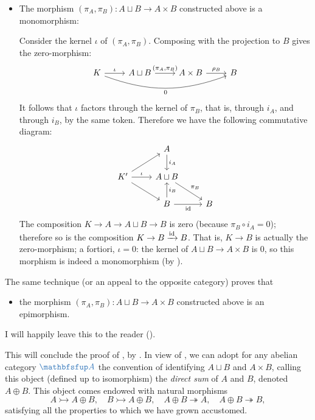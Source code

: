 \begin{itemize}
  By the same token, $\pi_A : A \sqcup B \to A$ is the cokernel of
  $i_B : B \to A \sqcup B$ and $i_B : B \to A \sqcup B$ is the kernel
  of $\pi_A : A \sqcup B \to A$.
\item The morphism $(\pi_A, \pi_B) : A \sqcup B \to A \times B$
  constructed above is a monomorphism:

  Consider the kernel $\iota$ of $(\pi_A, \pi_B)$. Composing with the
  projection to $B$ gives the zero-morphism:
  \[\begin{tikzcd}
      K \arrow[r, "\iota"] \arrow[rrr, "0"', bend right=20] & A \sqcup
      B \arrow[r, "{(\pi_A, \pi_B)}"] & A \times B \arrow[r, "\rho_B"]
      & B
    \end{tikzcd}\] It follows that $\iota$ factors through the kernel
  of $\pi_B$, that is, through $i_A$, and through $i_B$, by the same
  token.  Therefore we have the following commutative diagram:
  \[\begin{tikzcd}
      & A \arrow[d, "i_A"] & \\
      K \arrow[ur] \arrow[dr]' \arrow[r, "\iota"] &
      A \sqcup B \arrow[dr, "\pi_B"] & \\
      & B \arrow[u, "i_B"'] \arrow[r, "\id"'] & B
    \end{tikzcd}\] The composition $K \to A \to A \sqcup B \to B$ is
  zero (because $\pi_B \circ i_A = 0$); therefore so is the
  composition $K \to B \xrightarrow{\operatorname{id}} B$. That is, $K \to B$ is
  actually the zero-morphism; a fortiori, $\iota = 0$: the kernel of
  $A \sqcup B \to A \times B$ is $0$, so this morphism is indeed a
  monomorphism (by ).
\end{itemize}

The same technique (or an appeal to the opposite category) proves that

\begin{itemize}
\item the morphism $(\pi_A, \pi_B) : A \sqcup B \to A \times B$
  constructed above is an epimorphism.
\end{itemize}

I will happily leave this to the reader
().

This will conclude the proof of , by
.
In view of , we can adopt for any abelian
category $\categ{A}$ the convention of identifying $A \sqcup B$ and
$A \times B$, calling this object (defined up to isomorphism) the
\emph{direct sum} of $A$ and $B$, denoted $A \oplus B$. This object
comes endowed with natural morphisms
\[
  A \rightarrowtail A \oplus B, \quad B \rightarrowtail A \oplus B,
  \quad A \oplus B \twoheadrightarrow A, \quad A \oplus B
  \twoheadrightarrow B,
\]
satisfying all the properties to which we have grown accustomed.

